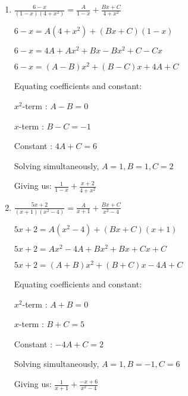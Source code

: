 \documentclass[../main.tex]{subfiles}
\begin{document}
\begin{enumerate}[itemsep=0.7cm]
    \item 
    $\frac{6-x}{(1-x)(4+x^2)}=\frac{A}{1-x}+\frac{Bx+C}{4+x^2}$

    $6-x=A(4+x^2)+(Bx+C)(1-x)$

    $6-x=4A+Ax^2+Bx-Bx^2+C-Cx$

    $6-x=(A-B)x^2+(B-C)x+4A+C$

    Equating coefficients and constant:

    $x^2$-term : $A-B=0$

    $x$-term : $B-C=-1$

    Constant : $4A+C=6$

    Solving simultaneously, $A=1, B=1, C=2$

    Giving us: $\frac{1}{1-x}+\frac{x+2}{4+x^2}$

    \item 
    $\frac{5x+2}{(x+1)(x^2-4)}=\frac{A}{x+1}+\frac{Bx+C}{x^2-4}$

    $5x+2=A(x^2-4)+(Bx+C)(x+1)$

    $5x+2=Ax^2-4A+Bx^2+Bx+Cx+C$

    $5x+2=(A+B)x^2+(B+C)x-4A+C$

    Equating coefficients and constant:

    $x^2$-term : $A+B=0$

    $x$-term : $B+C=5$

    Constant : $-4A+C=2$

    Solving simultaneously, $A=1, B=-1, C=6$

    Giving us: $\frac{1}{x+1}+\frac{-x+6}{x^2-4}$

\end{enumerate}
\end{document}
